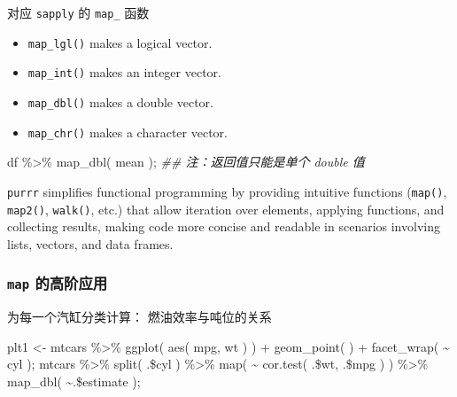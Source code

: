 \documentclass[
]{article}
\newenvironment{Shaded}{}{}
\newcommand{\DocumentationTok}[1]{\textcolor[rgb]{0.73,0.13,0.13}{\textit{#1}}}
\newcommand{\FunctionTok}[1]{\textcolor[rgb]{0.02,0.16,0.49}{#1}}
\newcommand{\NormalTok}[1]{#1}
\newcommand{\OtherTok}[1]{\textcolor[rgb]{0.00,0.44,0.13}{#1}}
\newcommand{\SpecialCharTok}[1]{\textcolor[rgb]{0.25,0.44,0.63}{#1}}
\begin{document}
对应 \texttt{sapply} 的 \texttt{map\_} 函数

\begin{itemize}
\item
  \texttt{map\_lgl()} makes a logical vector.
\item
  \texttt{map\_int()} makes an integer vector.
\item
  \texttt{map\_dbl()} makes a double vector.
\item
  \texttt{map\_chr()} makes a character vector.
\end{itemize}

\begin{Shaded}
\begin{Highlighting}[]
\NormalTok{df }\SpecialCharTok{\%\textgreater{}\%} \FunctionTok{map\_dbl}\NormalTok{( mean ); }\DocumentationTok{\#\# 注：返回值只能是单个 double 值}
\end{Highlighting}
\end{Shaded}

\texttt{purrr} simplifies functional programming by providing intuitive
functions (\texttt{map()}, \texttt{map2()}, \texttt{walk()}, etc.) that
allow iteration over elements, applying functions, and collecting
results, making code more concise and readable in scenarios involving
lists, vectors, and data frames.

\hypertarget{map-ux7684ux9ad8ux9636ux5e94ux7528}{%
\subsubsection{\texorpdfstring{\texttt{map} 的高阶应用
}{map 的高阶应用 }}\label{map-ux7684ux9ad8ux9636ux5e94ux7528}}

为每一个汽缸分类计算： 燃油效率与吨位的关系

\begin{Shaded}
\begin{Highlighting}[]
\NormalTok{plt1 }\OtherTok{\textless{}{-}} 
\NormalTok{  mtcars }\SpecialCharTok{\%\textgreater{}\%} 
  \FunctionTok{ggplot}\NormalTok{( }\FunctionTok{aes}\NormalTok{( mpg, wt ) ) }\SpecialCharTok{+} 
  \FunctionTok{geom\_point}\NormalTok{(  ) }\SpecialCharTok{+} \FunctionTok{facet\_wrap}\NormalTok{( }\SpecialCharTok{\textasciitilde{}}\NormalTok{ cyl );}
\NormalTok{mtcars }\SpecialCharTok{\%\textgreater{}\%} 
\FunctionTok{split}\NormalTok{( .}\SpecialCharTok{\$}\NormalTok{cyl ) }\SpecialCharTok{\%\textgreater{}\%}
\FunctionTok{map}\NormalTok{( }\SpecialCharTok{\textasciitilde{}} \FunctionTok{cor.test}\NormalTok{( .}\SpecialCharTok{\$}\NormalTok{wt, .}\SpecialCharTok{\$}\NormalTok{mpg ) ) }\SpecialCharTok{\%\textgreater{}\%} 
\FunctionTok{map\_dbl}\NormalTok{( }\SpecialCharTok{\textasciitilde{}}\NormalTok{.}\SpecialCharTok{\$}\NormalTok{estimate );}
\end{Highlighting}
\end{Shaded}
\end{document}
